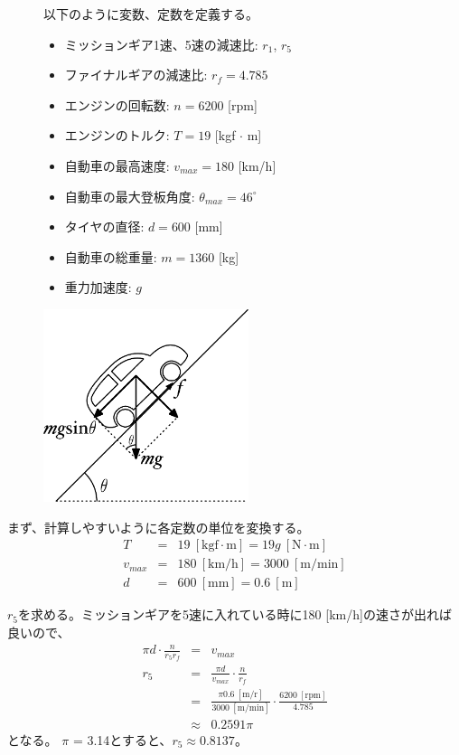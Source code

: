 \documentclass[titlepage]{jsarticle}
\begin{document}
\begin{figure}[h]
  \begin{minipage}{0.495\hsize}
    以下のように変数、定数を定義する。
      \begin{itemize}
        \item ミッションギア1速、5速の減速比: $r_1$, $r_5$
        \item ファイナルギアの減速比: $r_f = 4.785$
        \item エンジンの回転数: $n = 6200$ [rpm]
        \item エンジンのトルク: $T = 19$ [kgf $\cdot$ m]
        \item 自動車の最高速度: $v_{max} = 180$ [km/h]
        \item 自動車の最大登板角度: $\theta_{max} = 46^\circ$
        \item タイヤの直径: $d = 600$ [mm]
        \item 自動車の総重量: $m = 1360$ [kg]
        \item 重力加速度: $g$
      \end{itemize}
  \end{minipage}
  \begin{minipage}{0.495\hsize}
    \centering
    \includegraphics[width=6cm]{car.pdf}
  \end{minipage}
\end{figure}

まず、計算しやすいように各定数の単位を変換する。
\begin{eqnarray*}
  T &=& 19 \ [\mathrm{kgf \cdot m}] = 19g \ [\mathrm{N \cdot m}] \\
  v_{max} &=& 180 \ [\mathrm{km/h}] = 3000 \ [\mathrm{m/min}] \\
  d &=& 600 \ [\mathrm{mm}] = 0.6 \ [\mathrm m]
\end{eqnarray*}

$r_5$を求める。ミッションギアを5速に入れている時に180 [km/h]の速さが出れば良いので、
\begin{eqnarray*}
  \pi d \cdot \frac{n}{r_5r_f} &=& v_{max} \\
  r_5 &=& \frac{\pi d}{v_{max}} \cdot \frac{n}{r_f} \\
  &=& \frac{\pi 0.6 \ [\mathrm{m/r}]}{3000 \ [\mathrm{m/min}]} \cdot \frac{6200 \ [\mathrm{rpm}]}{4.785} \\
  &\approx& 0.2591 \pi
\end{eqnarray*}
となる。
$\pi$ = 3.14とすると、$r_5 \approx 0.8137$。
\end{document}

